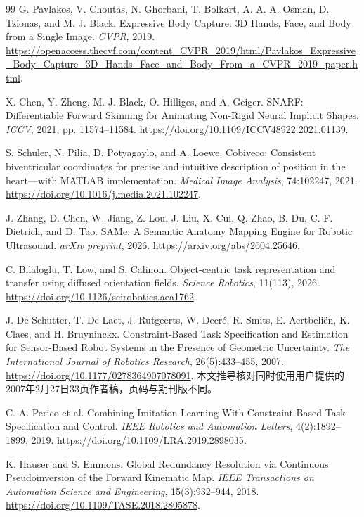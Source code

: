 \documentclass[UTF8,11pt,a4paper,fontset=fandol]{ctexart}
\numberwithin{equation}{section}
\theoremstyle{definition}
\begin{document}
\begin{thebibliography}{99}
G. Pavlakos, V. Choutas, N. Ghorbani, T. Bolkart, A. A. A. Osman, D. Tzionas, and M. J. Black.
Expressive Body Capture: 3D Hands, Face, and Body from a Single Image.
\emph{CVPR}, 2019. \url{https://openaccess.thecvf.com/content_CVPR_2019/html/Pavlakos_Expressive_Body_Capture_3D_Hands_Face_and_Body_From_a_CVPR_2019_paper.html}.

X. Chen, Y. Zheng, M. J. Black, O. Hilliges, and A. Geiger.
SNARF: Differentiable Forward Skinning for Animating Non-Rigid Neural Implicit Shapes.
\emph{ICCV}, 2021, pp. 11574--11584.
\url{https://doi.org/10.1109/ICCV48922.2021.01139}.

S. Schuler, N. Pilia, D. Potyagaylo, and A. Loewe.
Cobiveco: Consistent biventricular coordinates for precise and intuitive description of position in the heart---with MATLAB implementation.
\emph{Medical Image Analysis}, 74:102247, 2021.
\url{https://doi.org/10.1016/j.media.2021.102247}.

J. Zhang, D. Chen, W. Jiang, Z. Lou, J. Liu, X. Cui, Q. Zhao, B. Du, C. F. Dietrich, and D. Tao.
SAMe: A Semantic Anatomy Mapping Engine for Robotic Ultrasound.
\emph{arXiv preprint}, 2026. \url{https://arxiv.org/abs/2604.25646}.

C. Bilaloglu, T. L\"ow, and S. Calinon.
Object-centric task representation and transfer using diffused orientation fields.
\emph{Science Robotics}, 11(113), 2026.
\url{https://doi.org/10.1126/scirobotics.aea1762}.

J. De Schutter, T. De Laet, J. Rutgeerts, W. Decr\'e, R. Smits, E. Aertbeli\"en, K. Claes, and H. Bruyninckx.
Constraint-Based Task Specification and Estimation for Sensor-Based Robot Systems in the Presence of Geometric Uncertainty.
\emph{The International Journal of Robotics Research}, 26(5):433--455, 2007.
\url{https://doi.org/10.1177/0278364907078091}.
本文推导核对同时使用用户提供的2007年2月27日33页作者稿，页码与期刊版不同。

C. A. Perico et al.
Combining Imitation Learning With Constraint-Based Task Specification and Control.
\emph{IEEE Robotics and Automation Letters}, 4(2):1892--1899, 2019.
\url{https://doi.org/10.1109/LRA.2019.2898035}.

K. Hauser and S. Emmons.
Global Redundancy Resolution via Continuous Pseudoinversion of the Forward Kinematic Map.
\emph{IEEE Transactions on Automation Science and Engineering}, 15(3):932--944, 2018.
\url{https://doi.org/10.1109/TASE.2018.2805878}.


\end{thebibliography}
\end{document}
